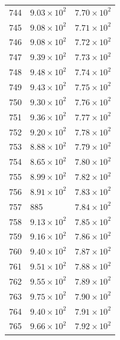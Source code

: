 \begin{table}[H]
\begin{tabular}{lll}
744 & $\displaystyle 9.03 \times 10^{2}$ & $\displaystyle 7.70 \times 10^{2}$ \\
745 & $\displaystyle 9.08 \times 10^{2}$ & $\displaystyle 7.71 \times 10^{2}$ \\
746 & $\displaystyle 9.08 \times 10^{2}$ & $\displaystyle 7.72 \times 10^{2}$ \\
747 & $\displaystyle 9.39 \times 10^{2}$ & $\displaystyle 7.73 \times 10^{2}$ \\
748 & $\displaystyle 9.48 \times 10^{2}$ & $\displaystyle 7.74 \times 10^{2}$ \\
749 & $\displaystyle 9.43 \times 10^{2}$ & $\displaystyle 7.75 \times 10^{2}$ \\
750 & $\displaystyle 9.30 \times 10^{2}$ & $\displaystyle 7.76 \times 10^{2}$ \\
751 & $\displaystyle 9.36 \times 10^{2}$ & $\displaystyle 7.77 \times 10^{2}$ \\
752 & $\displaystyle 9.20 \times 10^{2}$ & $\displaystyle 7.78 \times 10^{2}$ \\
753 & $\displaystyle 8.88 \times 10^{2}$ & $\displaystyle 7.79 \times 10^{2}$ \\
754 & $\displaystyle 8.65 \times 10^{2}$ & $\displaystyle 7.80 \times 10^{2}$ \\
755 & $\displaystyle 8.99 \times 10^{2}$ & $\displaystyle 7.82 \times 10^{2}$ \\
756 & $\displaystyle 8.91 \times 10^{2}$ & $\displaystyle 7.83 \times 10^{2}$ \\
757 & 885 & $\displaystyle 7.84 \times 10^{2}$ \\
758 & $\displaystyle 9.13 \times 10^{2}$ & $\displaystyle 7.85 \times 10^{2}$ \\
759 & $\displaystyle 9.16 \times 10^{2}$ & $\displaystyle 7.86 \times 10^{2}$ \\
760 & $\displaystyle 9.40 \times 10^{2}$ & $\displaystyle 7.87 \times 10^{2}$ \\
761 & $\displaystyle 9.51 \times 10^{2}$ & $\displaystyle 7.88 \times 10^{2}$ \\
762 & $\displaystyle 9.55 \times 10^{2}$ & $\displaystyle 7.89 \times 10^{2}$ \\
763 & $\displaystyle 9.75 \times 10^{2}$ & $\displaystyle 7.90 \times 10^{2}$ \\
764 & $\displaystyle 9.40 \times 10^{2}$ & $\displaystyle 7.91 \times 10^{2}$ \\
765 & $\displaystyle 9.66 \times 10^{2}$ & $\displaystyle 7.92 \times 10^{2}$ \\

\end{tabular}
\end{table}
